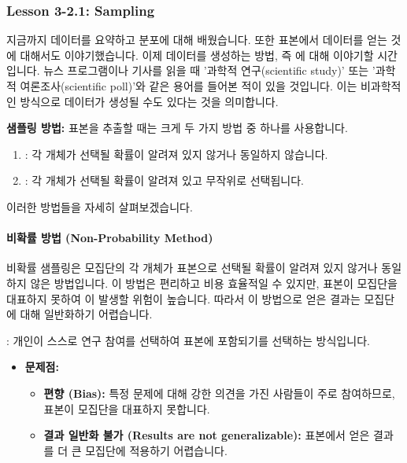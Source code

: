 \documentclass[11pt,a4paper]{article}
\begin{document}
\subsubsection{Lesson 3-2.1: Sampling}

지금까지 데이터를 요약하고 분포에 대해 배웠습니다. 또한 표본에서 데이터를 얻는 것에 대해서도 이야기했습니다. 이제 데이터를 생성하는 방법, 즉 에 대해 이야기할 시간입니다. 뉴스 프로그램이나 기사를 읽을 때 '과학적 연구(scientific study)' 또는 '과학적 여론조사(scientific poll)'와 같은 용어를 들어본 적이 있을 것입니다. 이는 비과학적인 방식으로 데이터가 생성될 수도 있다는 것을 의미합니다.

\begin{tcolorbox}[summarybox]
\textbf{샘플링 방법:}
표본을 추출할 때는 크게 두 가지 방법 중 하나를 사용합니다.
\begin{enumerate}
    \item {}: 각 개체가 선택될 확률이 알려져 있지 않거나 동일하지 않습니다.
    \item {}: 각 개체가 선택될 확률이 알려져 있고 무작위로 선택됩니다.
\end{enumerate}
이러한 방법들을 자세히 살펴보겠습니다.
\end{tcolorbox}

\paragraph{비확률 방법 (Non-Probability Method)}
비확률 샘플링은 모집단의 각 개체가 표본으로 선택될 확률이 알려져 있지 않거나 동일하지 않은 방법입니다. 이 방법은 편리하고 비용 효율적일 수 있지만, 표본이 모집단을 대표하지 못하여 이 발생할 위험이 높습니다. 따라서 이 방법으로 얻은 결과는 모집단에 대해 일반화하기 어렵습니다.

\begin{tcolorbox}[mybox, title={비확률 방법 (1/2): 자발적 샘플링 (Volunteer Sampling)}]
: 개인이 스스로 연구 참여를 선택하여 표본에 포함되기를 선택하는 방식입니다.
\begin{itemize}
    \item \textbf{문제점:}
    \begin{itemize}
        \item \textbf{편향 (Bias):} 특정 문제에 대해 강한 의견을 가진 사람들이 주로 참여하므로, 표본이 모집단을 대표하지 못합니다.
        \item \textbf{결과 일반화 불가 (Results are not generalizable):} 표본에서 얻은 결과를 더 큰 모집단에 적용하기 어렵습니다.
    \end{itemize}
\end{itemize}
\end{tcolorbox}
\end{document}
